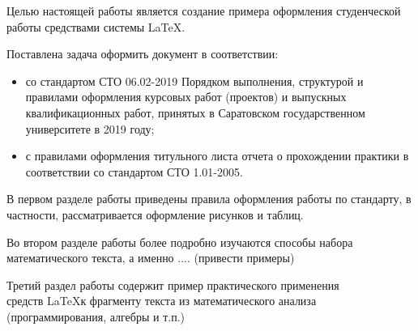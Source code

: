 \documentclass[bachelor, och, coursework]{SCWorks}
\begin{document}


\tableofcontents





\intro
Целью настоящей работы является создание примера оформления студенческой работы средствами системы \LaTeX.

Поставлена задача оформить документ в соответствии:
\begin{itemize}
    \item со стандартом СТО 06.02-2019 Порядком выполнения, структурой и правилами оформления курсовых работ (проектов) и выпускных квалификационных работ, принятых в Саратовском государственном университете в 2019 году;
    \item с правилами оформления титульного листа отчета о прохождении практики в соответствии со стандартом СТО 1.01-2005.
\end{itemize}
В первом разделе работы приведены правила оформления работы по стандарту, в частности, рассматривается оформление рисунков и таблиц.

Во втором разделе работы более подробно изучаются способы набора математического текста, а именно .... (привести примеры)

Третий раздел работы содержит пример практического применения \\ средств \LaTeX к фрагменту текста из математического анализа (программирования, алгебры и т.п.)
\end{document}

